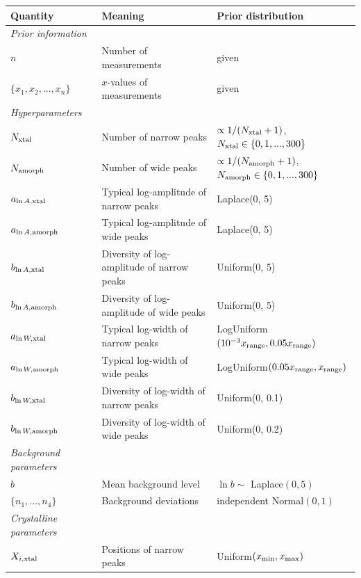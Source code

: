 \documentclass[preprint, a4paper]{elsarticle}
\newcommand{\x}{x}
\begin{document}
\begin{landscape}

\begin{table}
\footnotesize
\centering
\begin{tabular}{|lll|}
\hline
{\bf Quantity}      &   {\bf Meaning}   &  {\bf Prior distribution}\\
\hline
{\em Prior information}&&\\
\hline
$n$ & Number of measurements & given\\
$\{\x_1, \x_2, ..., \x_n\}$  & $\x$-values of measurements & given \\
\hline
{\em Hyperparameters} & &\\
$N_{\rm xtal}$   &   Number of narrow peaks    &  $\propto 1/(N_{\rm xtal}+1)$, $N_{\rm xtal} \in \{0, 1, ..., 300\}$ \\
$N_{\rm amorph}$   &   Number of wide peaks    &  $\propto 1/(N_{\rm amorph}+1)$,
$N_{\rm amorph} \in \{0, 1, ..., 300\}$ \\
$a_{\ln A, \rm xtal}$ & Typical log-amplitude of narrow peaks & Laplace(0, 5)\\
$a_{\ln A, \rm amorph}$ & Typical log-amplitude of wide peaks & Laplace(0, 5)\\
$b_{\ln A, \rm xtal}$ & Diversity of log-amplitude of narrow peaks & Uniform(0, 5)\\
$b_{\ln A, \rm amorph}$ & Diversity of log-amplitude of wide peaks & Uniform(0, 5)\\
$a_{\ln W, \rm xtal}$ & Typical log-width of narrow peaks & LogUniform$(10^{-3}x_{\rm range}, 0.05x_{\rm range})$\\
$a_{\ln W, \rm amorph}$ & Typical log-width of wide peaks & LogUniform$(0.05x_{\rm range}, x_{\rm range})$\\
$b_{\ln W, \rm xtal}$ & Diversity of log-width of narrow peaks & Uniform(0, 0.1)\\
$b_{\ln W, \rm amorph}$ & Diversity of log-width of wide peaks & Uniform(0, 0.2)\\
\hline
{\em Background parameters}&&\\
$b$       & Mean background level       & $\ln b \sim $ Laplace$(0, 5)$\\
$\{n_1, ..., n_4\}$  & Background deviations & independent Normal$(0,1)$\\
\hline
{\em Crystalline parameters}&&\\
$X_{i, \rm xtal}$ & Positions of narrow peaks &
                            Uniform$(x_{\rm min}, x_{\rm max})$ \\

\end{tabular}
\end{table}
\end{landscape}
\end{document}
